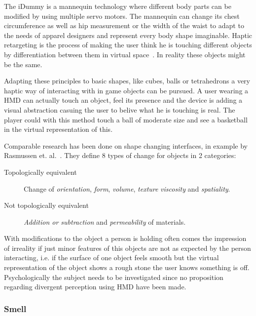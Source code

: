 The iDummy is a mannequin technology where different body parts can be modified by using multiple servo motors. The mannequin can change its chest circumference as well as hip measurement or the width of the waist to adapt to the needs of apparel designers and represent every body shape imaginable. \newline
Haptic retargeting is the process of making the user think he is touching different objects by differentiation between them in virtual space~\cite{Azmandian:2016:HRD:2858036.2858226}. In reality these objects might be the same. 

Adapting these principles to basic shapes, like cubes, balls or tetrahedrons a very haptic way of interacting with in game objects can be pursued. A user wearing a HMD can actually touch an object, feel its presence and the device is adding a visual abstraction casuing the user to belive what he is touching is real. The player could with this method touch a ball of moderate size and see a basketball in the virtual representation of this.

Comparable research has been done on shape changing interfaces, in example by Rasmussen et. al.~\cite{Rasmussen:2012:SIR:2207676.2207781}. They define 8 types of change for objects in 2 categories:

\begin{description}
	\item[Topologically equivalent] Change of \textit{orientation}, \textit{form},  \textit{volume}, \textit{texture} \textit{viscosity} and \textit{spatiality}.
	\item[Not topologically equivalent] \textit{Addition or subtraction} and \textit{permeability} of materials.
\end{description}

With modifications to the object a person is holding often comes the impression of irreality if just minor features of this objects are not as expected by the person interacting, i.e. if the surface of one object feels smooth but the virtual representation of the object shows a rough stone the user knows something is off. \newline
Psychologically the subject needs to be investigated since no proposition regarding divergent perception using HMD have been made.

\subsubsection{Smell}

